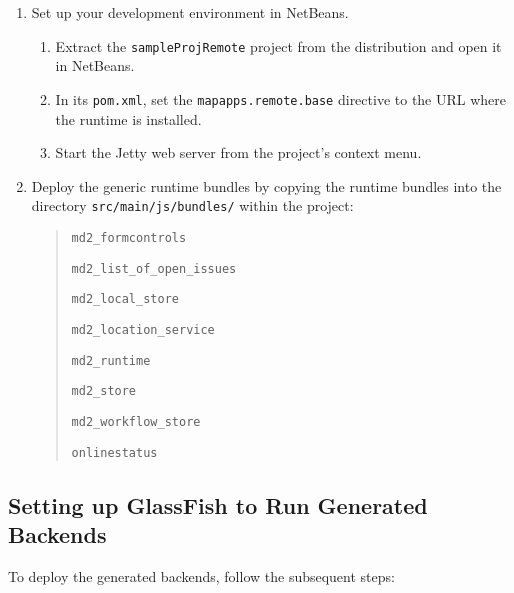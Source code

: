 \begin{enumerate}
\item {Set up your \mapapps  development environment in NetBeans.}

\begin{enumerate}
\item Extract the \lstinline|sampleProjRemote| project from the \mapapps distribution and open it in NetBeans. \label{item:extraction}
\item In its \lstinline|pom.xml|,
 set the \lstinline|mapapps.remote.base| directive to the URL where the \mapapps runtime is installed.
\item Start the Jetty web server from the project's context menu.

\end{enumerate}

\item Deploy the generic \MD runtime bundles by copying the \MD runtime bundles into the directory \lstinline[language=Simple]|src/main/js/bundles/| within the project:
	\begin{quotation}
		 \lstinline|md2_formcontrols|
		 
		 \lstinline|md2_list_of_open_issues|
		 
		 \lstinline|md2_local_store|
		 
		 \lstinline|md2_location_service|
		 
		 \lstinline|md2_runtime|
		 		 
		 \lstinline|md2_store|
		 
		 \lstinline|md2_workflow_store|
		 
		 \lstinline|onlinestatus|
	\end{quotation}



\end{enumerate}

\subsection{Setting up GlassFish to Run Generated Backends}
To deploy the generated backends, follow the subsequent steps:


